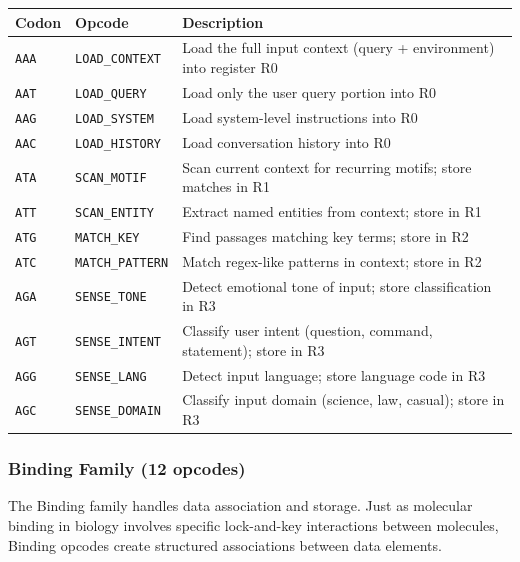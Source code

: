 \begin{center}
\renewcommand{\arraystretch}{1.1}
\small
\begin{tabularx}{0.97\textwidth}{L{1.2cm} L{3cm} Y}
\toprule
\textbf{Codon} & \textbf{Opcode} & \textbf{Description} \\
\midrule
\texttt{AAA} & \texttt{LOAD\_CONTEXT} & Load the full input context (query + environment) into register R0 \\
\texttt{AAT} & \texttt{LOAD\_QUERY} & Load only the user query portion into R0 \\
\texttt{AAG} & \texttt{LOAD\_SYSTEM} & Load system-level instructions into R0 \\
\texttt{AAC} & \texttt{LOAD\_HISTORY} & Load conversation history into R0 \\
\texttt{ATA} & \texttt{SCAN\_MOTIF} & Scan current context for recurring motifs; store matches in R1 \\
\texttt{ATT} & \texttt{SCAN\_ENTITY} & Extract named entities from context; store in R1 \\
\texttt{ATG} & \texttt{MATCH\_KEY} & Find passages matching key terms; store in R2 \\
\texttt{ATC} & \texttt{MATCH\_PATTERN} & Match regex-like patterns in context; store in R2 \\
\texttt{AGA} & \texttt{SENSE\_TONE} & Detect emotional tone of input; store classification in R3 \\
\texttt{AGT} & \texttt{SENSE\_INTENT} & Classify user intent (question, command, statement); store in R3 \\
\texttt{AGG} & \texttt{SENSE\_LANG} & Detect input language; store language code in R3 \\
\texttt{AGC} & \texttt{SENSE\_DOMAIN} & Classify input domain (science, law, casual); store in R3 \\
\bottomrule
\end{tabularx}
\end{center}

\subsubsection{Binding Family (12 opcodes)}

The Binding family handles data association and storage. Just as molecular binding in biology involves specific lock-and-key interactions between molecules, Binding opcodes create structured associations between data elements.

